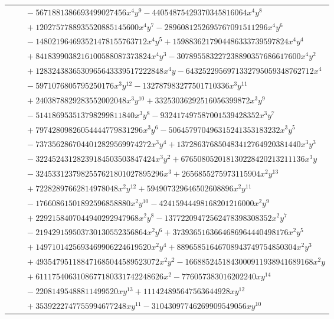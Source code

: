 \documentclass[11pt]{article}
\begin{document}
\begin{longtable}{@{}ll@{}}
 & $\quad -5671881386693499027456x^{4}y^{9}-44054875429370345816064x^{4}y^{8}$\\
 & $\quad +1202757788935520885145600x^{4}y^{7}-2896081252695767091511296x^{4}y^{6}$\\
 & $\quad -148021964693521478155763712x^{4}y^{5}+1598836217904486333739597824x^{4}y^{4}$\\
 & $\quad +8418399038216100588087373824x^{4}y^{3}-307895583227238890357686617600x^{4}y^{2}$\\
 & $\quad +1283243836530965643339517222848x^{4}y-6432522956971332795059348762712x^{4}$\\
 & $\quad -5971076805795250176x^{3}y^{12}-132787983277501710336x^{3}y^{11}$\\
 & $\quad +2403878829283552002048x^{3}y^{10}+33253036292516056399872x^{3}y^{9}$\\
 & $\quad -514186953513798299811840x^{3}y^{8}-932417497587001539428352x^{3}y^{7}$\\
 & $\quad +79742809826054444779831296x^{3}y^{6}-506457970496315241353183232x^{3}y^{5}$\\
 & $\quad -7373562867044012829569974272x^{3}y^{4}+137286376850483412764920381440x^{3}y^{3}$\\
 & $\quad -32245243128239184503503847424x^{3}y^{2}+676508052018130228420213211136x^{3}y$\\
 & $\quad -3245331237982557621801027895296x^{3}+2656855275973115904x^{2}y^{13}$\\
 & $\quad +72282897662814978048x^{2}y^{12}+594907329646502608896x^{2}y^{11}$\\
 & $\quad -17660861501892596858880x^{2}y^{10}-42415944498168201216000x^{2}y^{9}$\\
 & $\quad +2292158407044940292947968x^{2}y^{8}-13772209472562478398308352x^{2}y^{7}$\\
 & $\quad -219429159503730130552356864x^{2}y^{6}+3739365163664686964440498176x^{2}y^{5}$\\
 & $\quad +1497101425693469906224619520x^{2}y^{4}+88965851646708943749754850304x^{2}y^{3}$\\
 & $\quad +493547951188471685044589523072x^{2}y^{2}-1668852451843000911938941689168x^{2}y$\\
 & $\quad +6111754063108677180331742248626x^{2}-776057383016202240xy^{14}$\\
 & $\quad -22081495488811499520xy^{13}+111424895647563644928xy^{12}$\\
 & $\quad +3539222747755994677248xy^{11}-31043097746269909549056xy^{10}$\\

\end{longtable}
\end{document}
